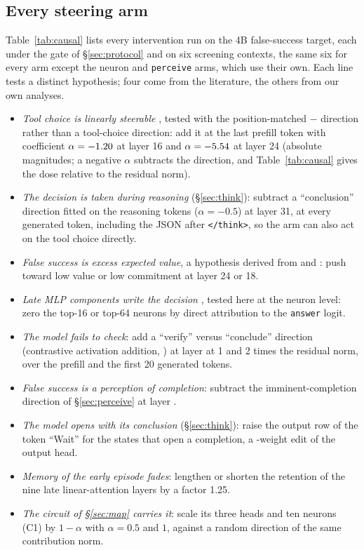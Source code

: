 \subsection{Every steering arm}\label{sec:every-arm}
Table~\ref{tab:causal} lists every intervention run on the 4B false-success target, each under the gate of \S\ref{sec:protocol} and on six screening contexts, the same six for every arm except the neuron and \texttt{perceive} arms, which use their own. Each line tests a distinct hypothesis; four come from the literature, the others from our own analyses.
\begin{itemize}
\item \emph{Tool choice is linearly steerable} \citep{wu2026toolcalling}, tested with the position-matched \fsp{}$-$\fsm{} direction rather than a tool-choice direction: add it at the last prefill token with coefficient $\alpha=-1.20$ at layer 16 and $\alpha=-5.54$ at layer 24 (absolute magnitudes; a negative $\alpha$ subtracts the direction, and Table~\ref{tab:causal} gives the dose relative to the residual norm).
\item \emph{The decision is taken during reasoning} (\S\ref{sec:think}): subtract a ``conclusion'' direction fitted on the reasoning tokens ($\alpha=-0.5$) at layer 31, at every generated token, including the JSON after \texttt{</think>}, so the arm can also act on the tool choice directly. %
\item \emph{False success is excess expected value}, a hypothesis derived from \citet{jiang2026value} and \citet{kumaran2026commit}: push toward low value or low commitment at layer 24 or 18.
\item \emph{Late MLP components write the decision} \citep{dutta2026termination}, tested here at the neuron level: zero the top-16 or top-64 neurons by direct attribution to the \texttt{answer} logit.
\item \emph{The model fails to check}: add a ``verify'' versus ``conclude'' direction (contrastive activation addition, \citealp{rimsky2023caa}) at layer \verifyLayer{} at 1 and 2 times the residual norm, over the prefill and the first 20 generated tokens.
\item \emph{False success is a perception of completion}: subtract the imminent-completion direction of \S\ref{sec:perceive} at layer \pcLayer.
\item \emph{The model opens with its conclusion} (\S\ref{sec:think}): raise the output row of the token ``Wait'' for the states that open a completion, a \waitWeights-weight edit of the output head.
\item \emph{Memory of the early episode fades}: lengthen or shorten the retention of the nine late linear-attention layers by a factor 1.25.
\item \emph{The circuit of \S\ref{sec:map} carries it}: scale its three heads and ten neurons (C1) by $1-\alpha$ with $\alpha=0.5$ and $1$, against a random direction of the same contribution norm.
\end{itemize}
